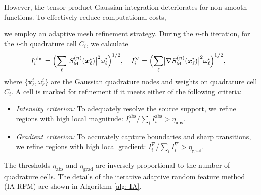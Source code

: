\documentclass{article}
\theoremstyle{plain}
\theoremstyle{definition}
\begin{document}
However, the tensor-product Gaussian integration deteriorates for non-smooth functions.
To effectively reduce computational costs,  {we employ an adaptive mesh refinement strategy. During the $n$-th iteration, for the $i$-th quadrature cell $C_i$, we calculate
\begin{align} \label{eq:quad-indicator}
 I_{i}^{\text{abs}} = \Bigl(%
 \sum_{\ell}  
 \bigl|S_{\text{M}}^{(n)}(\boldsymbol{x}^{i}_\ell)\bigr|^2 \omega^{i}_\ell\Bigr)^{1/2}, 
\quad
I_{i}^{\nabla} &= \Bigl(\sum_\ell 
 \bigl|\nabla S_{\text{M}}^{(n)}(\boldsymbol{x}^i_\ell)\bigr|^2\omega^i_\ell\Bigr)^{1/2},  
 \end{align}
where $\{ \boldsymbol{x}^i_\ell, \omega^i_\ell \}$ are the Gaussian quadrature nodes and weights on quadrature cell $C_i$.
A cell is marked for refinement if it meets either of the following criteria:
\begin{itemize}
\item \emph{Intensity criterion:} To adequately resolve the source support, we refine regions with high local magnitude: $I_{i}^{\text{abs}}/\sum_i I_{i}^{\text{abs}}  > {\eta_{\text{abs}}}$.
\item \emph{Gradient criterion:} To accurately capture boundaries and sharp transitions, we refine regions with high local gradient: 
$ I_{i}^{\nabla}/\sum_i I_{i}^{\nabla} > \eta_{\text{grad}}$. 
\end{itemize}
 The thresholds $\eta_{\text{abs}}$ and $\eta_{\text{grad}}$ are inversely proportional to the number of quadrature cells. %
 The details of the iterative adaptive random feature method (IA-RFM) are shown in Algorithm \ref{alg: IA}.}
\end{document}
